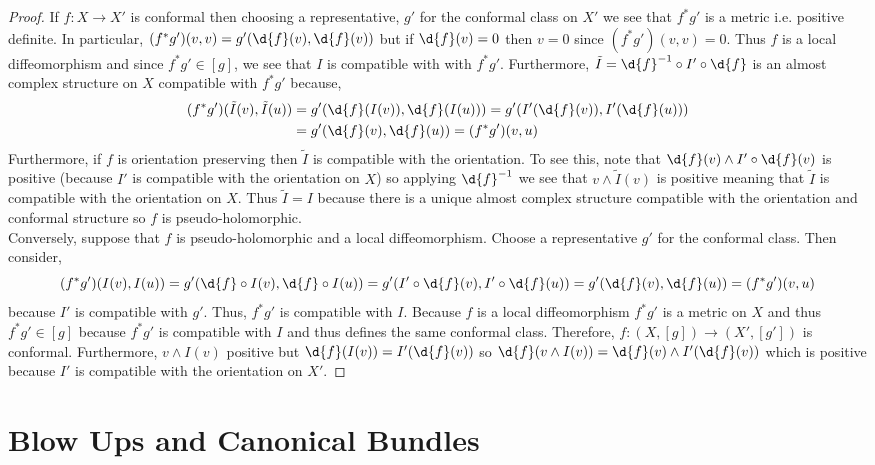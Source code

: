 \documentclass[12pt]{article}
\begin{document}
\begin{proof}
If $f : X \to X'$ is conformal then choosing a representative, $g'$ for the conformal class on $X'$ we see that $f^* g'$ is a metric i.e. positive definite. In particular, $(f^* g')(v, v) = g'(\d{f}(v), \d{f}(v))$ but if $\d{f}(v) = 0$ then $v = 0$ since $(f^* g')(v, v) = 0$. Thus $f$ is a local diffeomorphism and since $f^* g' \in [g]$, we see that $I$ is compatible with with $f^* g'$. Furthermore, $\tilde{I} = \d{f}^{-1} \circ I' \circ \d{f}$ is an almost complex structure on $X$ compatible with $f^* g'$ because,
\begin{align*}
(f^* g')(\tilde{I}(v), \tilde{I}(u)) & = g'(\d{f}(I(v)), \d{f}(I(u))) = g'(I'(\d{f}(v)), I'(\d{f}(u))) 
\\
& = g'(\d{f}(v), \d{f}(u)) = (f^* g')(v, u)
\end{align*}
Furthermore, if $f$ is orientation preserving then $\tilde{I}$ is compatible with the orientation. To see this, note that $\d{f}(v) \wedge I' \circ \d{f}(v)$ is positive (because $I'$ is compatible with the orientation on $X$) so applying $\d{f}^{-1}$ we see that $v \wedge \tilde{I}(v)$ is positive meaning that $\tilde{I}$ is compatible with the orientation on $X$. Thus $\tilde{I} = I$ because there is a unique almost complex structure compatible with the orientation and conformal structure so $f$ is pseudo-holomorphic.
\bigskip\\
Conversely, suppose that $f$ is pseudo-holomorphic and a local diffeomorphism. Choose a representative $g'$ for the conformal class. Then consider,
\[ (f^* g')(I(v), I(u)) = g'(\d{f} \circ I(v), \d{f} \circ I(u)) = g'(I' \circ \d{f}(v), I' \circ \d{f}(u)) = g'(\d{f}(v), \d{f}(u)) = (f^* g')(v, u) \]
because $I'$ is compatible with $g'$. Thus, $f^* g'$ is compatible with $I$. Because $f$ is a local diffeomorphism $f^* g'$ is a metric on $X$ and thus $f^* g' \in [g]$ because $f^* g'$ is compatible with $I$ and thus defines the same conformal class. Therefore, $f : (X, [g]) \to (X', [g'])$ is conformal. Furthermore, $v \wedge I(v)$ positive but $\d{f}(I(v)) = I'(\d{f}(v))$ so $\d{f}(v \wedge I(v)) = \d{f}(v) \wedge I'(\d{f}(v))$ which is positive because $I'$ is compatible with the orientation on $X'$.  
\end{proof}


\section{Blow Ups and Canonical Bundles}
\end{document}
